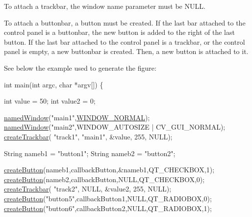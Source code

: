 \begin{DoxyItemize}
\item To attach a trackbar, the window name parameter must be N\+U\+LL. 
\end{DoxyItemize}


\begin{DoxyItemize}
\item To attach a buttonbar, a button must be created. If the last bar attached to the control panel is a buttonbar, the new button is added to the right of the last button. If the last bar attached to the control panel is a trackbar, or the control panel is empty, a new buttonbar is created. Then, a new button is attached to it. 
\end{DoxyItemize}

See below the example used to generate the figure\+: 
\begin{DoxyPre}
\begin{DoxyCode}
\textcolor{keywordtype}{int} main(\textcolor{keywordtype}{int} argc, \textcolor{keywordtype}{char} *argv[])
\{

    \textcolor{keywordtype}{int} value = 50;
    \textcolor{keywordtype}{int} value2 = 0;


    \hyperlink{group__highgui_gad8dcfc13dd30b1339b3fc7fb3fb19603}{namedWindow}(\textcolor{stringliteral}{"main1"},\hyperlink{group__highgui_ga2afebfdebe6ea3696f89b4a7628e72e3}{WINDOW\_NORMAL});
    \hyperlink{group__highgui_gad8dcfc13dd30b1339b3fc7fb3fb19603}{namedWindow}(\textcolor{stringliteral}{"main2"},WINDOW\_AUTOSIZE | CV\_GUI\_NORMAL);
    \hyperlink{group__highgui_ga727bcca32e6bc9d52ae86894538318fa}{createTrackbar}( \textcolor{stringliteral}{"track1"}, \textcolor{stringliteral}{"main1"}, &value, 255,  NULL);

    String nameb1 = \textcolor{stringliteral}{"button1"};
    String nameb2 = \textcolor{stringliteral}{"button2"};

    \hyperlink{group__highgui__qt_ga5dc4aba06e0c07797e0dcc3dc0920d4c}{createButton}(nameb1,callbackButton,&nameb1,QT\_CHECKBOX,1);
    \hyperlink{group__highgui__qt_ga5dc4aba06e0c07797e0dcc3dc0920d4c}{createButton}(nameb2,callbackButton,NULL,QT\_CHECKBOX,0);
    \hyperlink{group__highgui_ga727bcca32e6bc9d52ae86894538318fa}{createTrackbar}( \textcolor{stringliteral}{"track2"}, NULL, &value2, 255, NULL);
    \hyperlink{group__highgui__qt_ga5dc4aba06e0c07797e0dcc3dc0920d4c}{createButton}(\textcolor{stringliteral}{"button5"},callbackButton1,NULL,QT\_RADIOBOX,0);
    \hyperlink{group__highgui__qt_ga5dc4aba06e0c07797e0dcc3dc0920d4c}{createButton}(\textcolor{stringliteral}{"button6"},callbackButton2,NULL,QT\_RADIOBOX,1);


\end{DoxyCode}
\end{DoxyPre}
